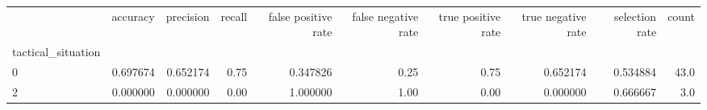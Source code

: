 \begin{tabular}{lrrrrrrrrr}
\toprule
{} &  accuracy &  precision &  recall &  false positive rate &  false negative rate &  true positive rate &  true negative rate &  selection rate &  count \\
tactical\_situation &           &            &         &                      &                      &                     &                     &                 &        \\
\midrule
0                  &  0.697674 &   0.652174 &    0.75 &             0.347826 &                 0.25 &                0.75 &            0.652174 &        0.534884 &   43.0 \\
2                  &  0.000000 &   0.000000 &    0.00 &             1.000000 &                 1.00 &                0.00 &            0.000000 &        0.666667 &    3.0 \\
\bottomrule
\end{tabular}
